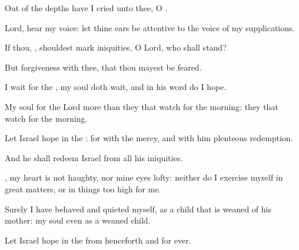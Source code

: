 {\Q {}Out of the
depths have I
cried unto thee, O
{}.


\par }{\Q {}Lord,
hear my
voice: let thine
ears be
attentive to the
voice of my
supplications.


\par }{\Q {}If thou,
{}, shouldest
mark
iniquities, O
Lord, who shall
stand?


\par }{\Q {}But
{}
forgiveness with thee, that thou mayest be
feared.


\par }{\BB \par }
{\Q {}I
wait for the
{}, my
soul doth
wait, and in his
word do I
hope.


\par }{\Q {}My
soul
{} for the
Lord more than they that
watch for the
morning:
{} they that
watch for the
morning.


\par }{\Q {}Let
Israel
hope in the
{}: for with the
{}
{}
mercy, and with him
{}
plenteous
redemption.


\par }{\Q {}And he shall
redeem
Israel from all his
iniquities.




\par }
{\Q {}, my
heart is not
haughty, nor mine
eyes
lofty: neither do I
exercise myself in great
matters, or in things too
high for me.


\par }{\Q {}Surely I have
behaved and
quieted
myself, as a child that is
weaned of his
mother: my
soul
{} even as a weaned
child.


\par }{\Q {}Let
Israel
hope in the
{} from henceforth and
for
ever.




\par }
